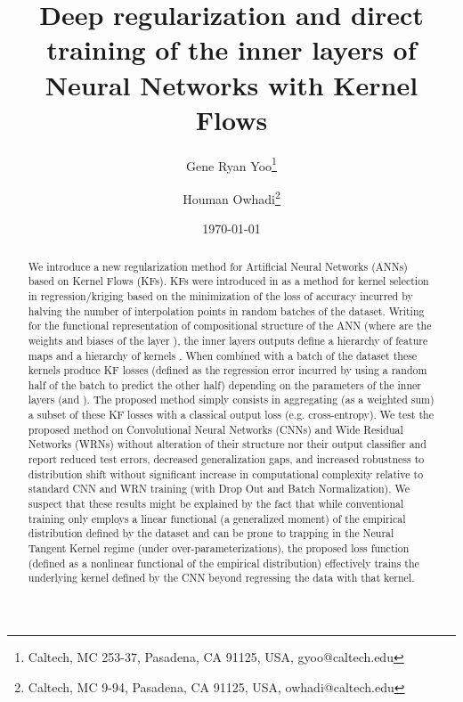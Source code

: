 \documentclass[11pt]{article}
\begin{document}
\title{ Deep regularization and direct training of the inner layers
of  Neural Networks with Kernel Flows}

\date{\today}



\author{Gene Ryan Yoo\thanks{Caltech, MC 253-37, Pasadena, CA 91125, USA, gyoo@caltech.edu} \and Houman Owhadi\thanks{Caltech,  MC 9-94, Pasadena, CA 91125, USA, owhadi@caltech.edu}}


\maketitle

\begin{abstract}
We introduce a new regularization method for Artificial Neural Networks (ANNs) based on Kernel Flows (KFs). KFs were introduced in \cite{owhadi2019kernel} as a method for kernel selection in regression/kriging based on the minimization of the loss of accuracy incurred by halving the number of interpolation points in random batches of the dataset.
 Writing    for the functional representation of compositional structure of the ANN (where  are the weights and biases of the layer ), the inner layers outputs  define a hierarchy of feature maps and a hierarchy of kernels .
When combined with a batch of the dataset these kernels produce KF losses  (defined as the  regression error incurred by
using a random half of the batch to predict the other half) depending on the parameters of the inner layers  (and ).
The proposed method simply consists in aggregating (as a weighted sum) a subset of these KF losses with a classical output loss (e.g. cross-entropy).
We test the proposed method on Convolutional Neural Networks (CNNs) and Wide Residual Networks (WRNs) without alteration of their structure nor their output classifier and  report reduced test errors, decreased generalization gaps, and increased robustness to distribution shift without significant increase in computational complexity relative to standard  CNN and WRN training (with Drop Out and Batch Normalization).
We suspect that these results might be explained by the fact that while conventional training only employs a linear functional (a generalized moment) of the empirical distribution defined by the dataset and can be prone to trapping in the Neural Tangent Kernel regime (under over-parameterizations), the proposed loss function  (defined as a nonlinear functional of the empirical distribution) effectively trains the underlying kernel defined by the CNN beyond regressing the data with that kernel.





\end{abstract}
\end{document}
